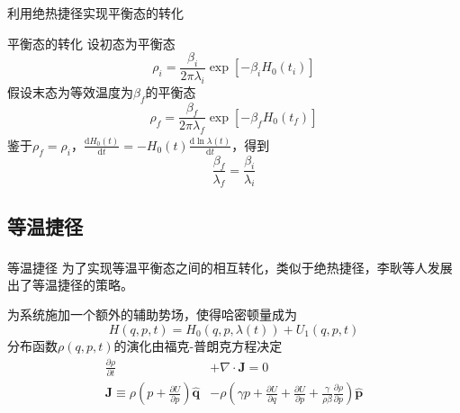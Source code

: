 \documentclass{beamer}
\newcommand{\upcite}[1]{\textsuperscript{\cite{#1}}}  %
\newcommand{\PP}[2]{\frac{\partial #1}{\partial #2}}
\newcommand{\DD}[2]{\frac{\mathrm{d} #1}{\mathrm{d} #2}}
\begin{document}
\begin{frame}{利用绝热捷径实现平衡态的转化}
\begin{alertblock}{平衡态的转化}
设初态为平衡态
\begin{equation}
    \rho_{i}=\frac{\beta_{i}}{2 \pi \lambda_{i}} \exp \left[-\beta_{i} H_0 \left(t_{i}\right)\right]
    \label{eq16}
\end{equation}
\pause
假设末态为等效温度为$\beta_{f}$的平衡态
\begin{equation}
    \rho_{f}=\frac{\beta_{f} }{2 \pi \lambda_{f}} \exp \left[-\beta_{f} H_0 \left(t_{f}\right)\right]
    \label{eq17}
\end{equation}
\pause
鉴于$\rho_{f}=\rho_{i}$，$\DD{H_0 (t)}{t}=-H_0 (t) \DD{\ln{\lambda(t)}}{t}$，得到\upcite{Tu2013}
\begin{equation}
    \frac{\beta_f}{\lambda_f} = \frac{\beta_i}{\lambda_i}
    \label{eq18}
\end{equation}
\end{alertblock}
\end{frame}
\subsection{等温捷径}
\begin{frame}{等温捷径}
为了实现等温平衡态之间的相互转化，类似于绝热捷径，李耿等人\upcite{Li2016}发展出了等温捷径的策略。

\pause

为系统施加一个额外的辅助势场，使得哈密顿量成为
\begin{equation}
    H(q, p, t)=H_{0}(q, p, \lambda(t))+U_{1}(q, p, t)
    \label{eq19}
\end{equation}
\pause
分布函数$\rho(q, p, t)$的演化由福克-普朗克方程决定
\begin{equation}
    \begin{split}
        \PP{\rho}{t} &+ \nabla \cdot \bm{J} = 0\\
        \bm{J} \equiv \rho \left( p + \PP{U}{p} \right) \hat{\mathbf{q}}&-\rho\left(\gamma p+\frac{\partial U}{\partial q}+ \PP{U}{p} + \frac{\gamma}{\rho \beta} \frac{\partial \rho}{\partial p}\right) \hat{\mathbf{p}}
    \end{split}
    \label{eq20}
\end{equation}
\end{frame}
\end{document}
